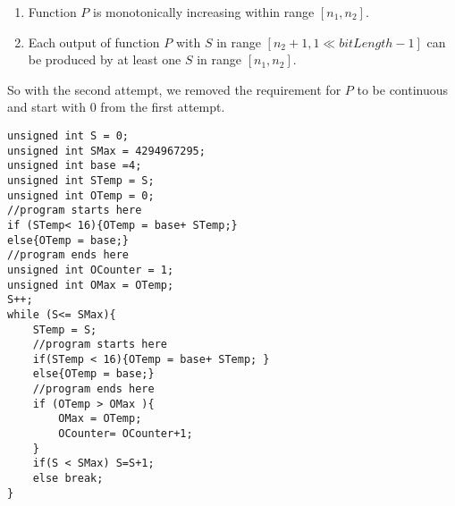 \begin{enumerate}
\item Function $P$ is monotonically increasing within range $[n_{1}, n_{2}]$.
\item Each output of function $P$ with $S$ in range $[n_{2}+1, 1\ll bitLength-1]$ can be produced by at least one $S$ in range $[n_{1}, n_{2}]$.
\end{enumerate}

So with the second attempt, we removed the requirement for $P$ to be continuous and start with $0$ from the first attempt.

\lstset{language=C}  
\begin{lstlisting}[float, caption={Implementation of the optimization with sanity check in C.},label=lst:2ndTry]
unsigned int S = 0;
unsigned int SMax = 4294967295;
unsigned int base =4;
unsigned int STemp = S;
unsigned int OTemp = 0;
//program starts here
if (STemp< 16){OTemp = base+ STemp;}
else{OTemp = base;}
//program ends here
unsigned int OCounter = 1;
unsigned int OMax = OTemp;
S++; 
while (S<= SMax){
	STemp = S;
	//program starts here
	if(STemp < 16){OTemp = base+ STemp;	}
	else{OTemp = base;}
	//program ends here
	if (OTemp > OMax ){
		OMax = OTemp;
		OCounter= OCounter+1;
	}
	if(S < SMax) S=S+1;
	else break;
}
\end{lstlisting}
